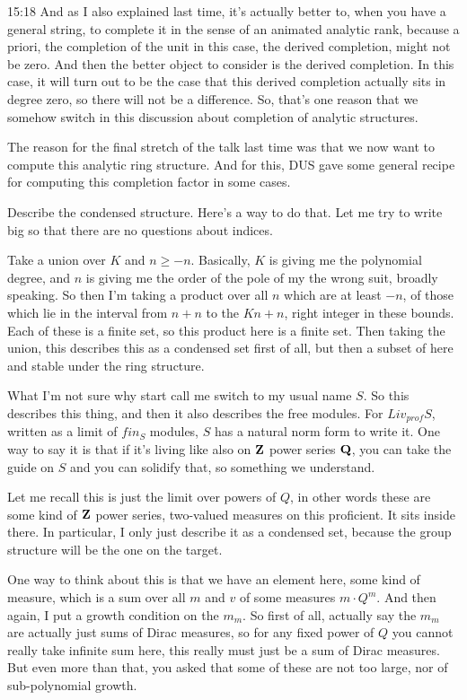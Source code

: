 \begin{unfinished}{15:18}
And as I also explained last time, it's actually better to, when you have a general string, to complete it in the sense of an animated analytic rank, because a priori, the completion of the unit in this case, the derived completion, might not be zero. And then the better object to consider is the derived completion. In this case, it will turn out to be the case that this derived completion actually sits in degree zero, so there will not be a difference. So, that's one reason that we somehow switch in this discussion about completion of analytic structures.

The reason for the final stretch of the talk last time was that we now want to compute this analytic ring structure. And for this, DUS gave some general recipe for computing this completion factor in some cases.

Describe the condensed structure. Here's a way to do that. Let me try to write big so that there are no questions about indices.

Take a union over $K$ and $n \geq -n$. Basically, $K$ is giving me the polynomial degree, and $n$ is giving me the order of the pole of my the wrong suit, broadly speaking. So then I'm taking a product over all $n$ which are at least $-n$, of those which lie in the interval from $n + n$ to the $Kn + n$, right integer in these bounds. Each of these is a finite set, so this product here is a finite set. Then taking the union, this describes this as a condensed set first of all, but then a subset of here and stable under the ring structure.

What I'm not sure why start call me switch to my usual name $S$. So this describes this thing, and then it also describes the free modules. For $Liv_{prof} S$, written as a limit of $fin_S$ modules, $S$ has a natural norm form to write it. One way to say it is that if it's living like also on $\mathbf Z$ power series $\mathbf Q$, you can take the guide on $S$ and you can solidify that, so something we understand.

Let me recall this is just the limit over powers of $Q$, in other words these are some kind of $\mathbf Z$ power series, two-valued measures on this proficient. It sits inside there. In particular, I only just describe it as a condensed set, because the group structure will be the one on the target.

One way to think about this is that we have an element here, some kind of measure, which is a sum over all $m$ and $v$ of some measures $m \cdot Q^m$. And then again, I put a growth condition on the $m_m$. So first of all, actually say the $m_m$ are actually just sums of Dirac measures, so for any fixed power of $Q$ you cannot really take infinite sum here, this really must just be a sum of Dirac measures. But even more than that, you asked that some of these are not too large, nor of sub-polynomial growth.


\end{unfinished}
